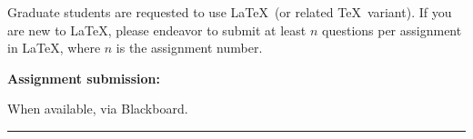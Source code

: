 {{Graduate students are requested to use \LaTeX\ (or related \TeX\
variant). If you are new to \LaTeX, please endeavor to submit at least $n$ questions per assignment in \LaTeX, where $n$ is the assignment number.

\textbf{Assignment submission:}

When available, via Blackboard.


}

\medskip
\medskip

\hrule

\medskip
}
{} %
